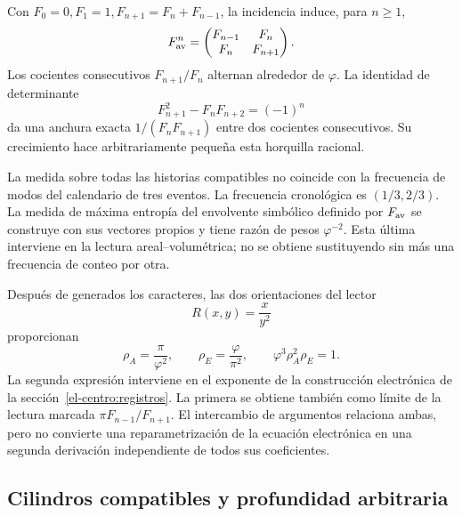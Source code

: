 Con \(F_0=0,F_1=1,F_{n+1}=F_n+F_{n-1}\), la incidencia induce, para \(n\geq1\),
\[
 F_{\rm av}^n=\begin{pmatrix}F_{n-1}&F_n\\F_n&F_{n+1}\end{pmatrix}.
\]
Los cocientes consecutivos \(F_{n+1}/F_n\) alternan alrededor de \(\varphi\). La identidad de determinante
\[
 F_{n+1}^2-F_nF_{n+2}=(-1)^n
\]
da una anchura exacta \(1/(F_nF_{n+1})\) entre dos cocientes consecutivos. Su crecimiento hace arbitrariamente pequeña esta horquilla racional.

La medida sobre todas las historias compatibles no coincide con la frecuencia de modos del calendario de tres eventos. La frecuencia cronológica es \((1/3,2/3)\). La medida de máxima entropía del envolvente simbólico definido por \(F_{\rm av}\) se construye con sus vectores propios y tiene razón de pesos \(\varphi^{-2}\). Esta última interviene en la lectura areal--volumétrica; no se obtiene sustituyendo sin más una frecuencia de conteo por otra.




Después de generados los caracteres, las dos orientaciones del lector
\[
 R(x,y)=\frac{x}{y^2}
\]
proporcionan
\begin{equation}
 \rho_A=\frac\pi{\varphi^2},\qquad
 \rho_E=\frac\varphi{\pi^2},\qquad
 \varphi^3\rho_A^2\rho_E=1.
 \label{eq:areal-electron}
\end{equation}
La segunda expresión interviene en el exponente de la construcción electrónica de la sección~\ref{el-centro:registros}. La primera se obtiene también como límite de la lectura marcada \(\pi F_{n-1}/F_{n+1}\). El intercambio de argumentos relaciona ambas, pero no convierte una reparametrización de la ecuación electrónica en una segunda derivación independiente de todos sus coeficientes.




\subsection{Cilindros compatibles y profundidad arbitraria}

